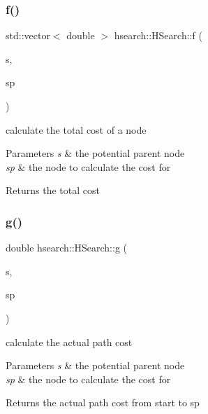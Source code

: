 \subsubsection{\texorpdfstring{f()}{f()}}
{\footnotesize\ttfamily std\+::vector$<$ double $>$ hsearch\+::\+H\+Search\+::f (\begin{DoxyParamCaption}\item[{\hyperlink{structhsearch_1_1SearchNode}{Search\+Node}}]{s,  }\item[{\hyperlink{structhsearch_1_1SearchNode}{Search\+Node}}]{sp }\end{DoxyParamCaption})\hspace{0.3cm}{\ttfamily [protected]}}



calculate the total cost of a node 


\begin{DoxyParams}{Parameters}
{\em s} & the potential parent node \\
\hline
{\em sp} & the node to calculate the cost for \\
\hline
\end{DoxyParams}
\begin{DoxyReturn}{Returns}
the total cost 
\end{DoxyReturn}
\mbox{\label{classhsearch_1_1HSearch_a687960c8dcfc61e16613a72a4ff1c14d}} 
\subsubsection{\texorpdfstring{g()}{g()}}
{\footnotesize\ttfamily double hsearch\+::\+H\+Search\+::g (\begin{DoxyParamCaption}\item[{\hyperlink{structhsearch_1_1SearchNode}{Search\+Node}}]{s,  }\item[{\hyperlink{structhsearch_1_1SearchNode}{Search\+Node}}]{sp }\end{DoxyParamCaption})\hspace{0.3cm}{\ttfamily [protected]}}



calculate the actual path cost 


\begin{DoxyParams}{Parameters}
{\em s} & the potential parent node \\
\hline
{\em sp} & the node to calculate the cost for \\
\hline
\end{DoxyParams}
\begin{DoxyReturn}{Returns}
the actual path cost from start to sp 
\end{DoxyReturn}
\mbox{\label{classhsearch_1_1HSearch_a2dbcfc312e89d60d9ec9b85eef271cbf}} 
